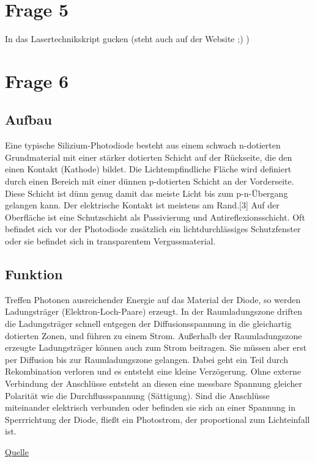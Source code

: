 \section{Frage 5}

In das Lasertechnikskript gucken (steht auch auf der Website ;) )


\section{Frage 6}

\subsection*{Aufbau}

Eine typische Silizium-Photodiode besteht aus einem schwach n-dotierten Grundmaterial mit einer stärker dotierten Schicht auf der Rückseite, die den einen Kontakt (Kathode) bildet. Die Lichtempfindliche Fläche wird definiert durch einen Bereich mit einer dünnen p-dotierten Schicht an der Vorderseite. Diese Schicht ist dünn genug damit das meiste Licht bis zum p-n-Übergang gelangen kann. Der elektrische Kontakt ist meistens am Rand.[3] Auf der Oberfläche ist eine Schutzschicht als Passivierung und Antireflexionsschicht. Oft befindet sich vor der Photodiode zusätzlich ein lichtdurchlässiges Schutzfenster oder sie befindet sich in transparentem Vergussmaterial.

\subsection*{Funktion}

Treffen Photonen ausreichender Energie auf das Material der Diode, so werden Ladungsträger (Elektron-Loch-Paare) erzeugt. In der Raumladungszone driften die Ladungsträger schnell entgegen der Diffusionsspannung in die gleichartig dotierten Zonen, und führen zu einem Strom. Außerhalb der Raumladungszone erzeugte Ladungsträger können auch zum Strom beitragen. Sie müssen aber erst per Diffusion bis zur Raumladungszone gelangen. Dabei geht ein Teil durch Rekombination verloren und es entsteht eine kleine Verzögerung. Ohne externe Verbindung der Anschlüsse entsteht an diesen eine messbare Spannung gleicher Polarität wie die Durchflussspannung (Sättigung). Sind die Anschlüsse miteinander elektrisch verbunden oder befinden sie sich an einer Spannung in Sperrrichtung der Diode, fließt ein Photostrom, der proportional zum Lichteinfall ist.

\href{http://de.wikipedia.org/wiki/Photodiode}{Quelle}

